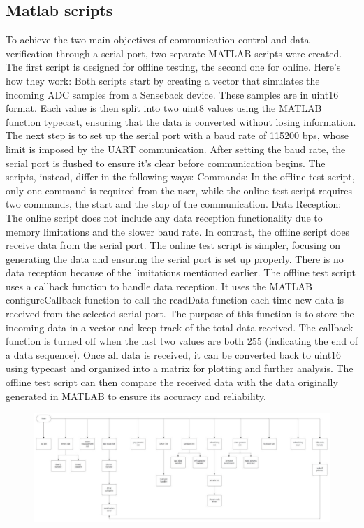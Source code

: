 \documentclass{Configuration_Files/PoliMi3i_thesis}
\begin{document}
\subsection{Matlab scripts}

To achieve the two main objectives of communication control and data verification through a serial port, two separate MATLAB scripts were created. The first script is designed for offline testing, the second one for online. Here's how they work:
Both scripts start by creating a vector that simulates the incoming ADC samples from a Senseback device. These samples are in uint16 format. Each value is then split into two uint8 values using the MATLAB function typecast, ensuring that the data is converted without losing information. The next step is to set up the serial port with a baud rate of 115200 bps, whose limit is imposed by the UART communication. After setting the baud rate, the serial port is flushed to ensure it's clear before communication begins.
The scripts, instead, differ in the following ways:
Commands: In the offline test script, only one command is required from the user, while the online test script requires two commands, the start and the stop of the communication.
Data Reception: The online script does not include any data reception functionality due to memory limitations and the slower baud rate. In contrast, the offline script does receive data from the serial port.
The online test script is simpler, focusing on generating the data and ensuring the serial port is set up properly. There is no data reception because of the limitations mentioned earlier.
The offline test script uses a callback function to handle data reception. It uses the MATLAB configureCallback function to call the readData function each time new data is received from the selected serial port. The purpose of this function is to store the incoming data in a vector and keep track of the total data received. The callback function is turned off when the last two values are both 255 (indicating the end of a data sequence). Once all data is received, it can be converted back to uint16 using typecast and organized into a matrix for plotting and further analysis. The offline test script can then compare the received data with the data originally generated in MATLAB to ensure its accuracy and reliability.

\begin{figure}[H]
	\includegraphics[scale=0.3]{Previous Implementation/Screenshot 2024-08-15 at 10.59.58.png}
	\centering
\end{figure}
\end{document}
